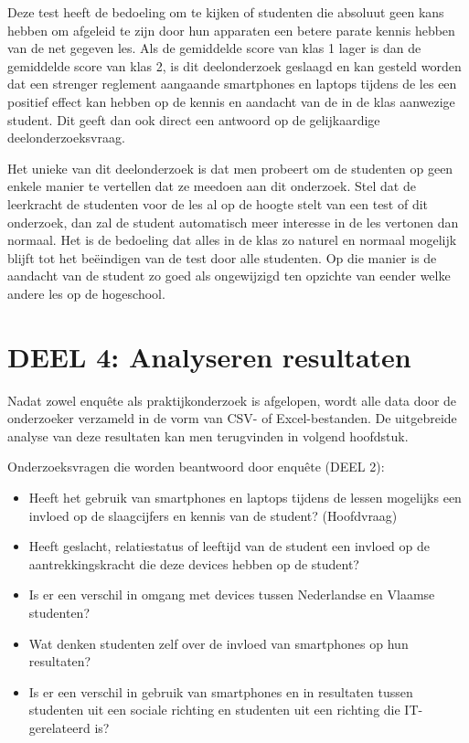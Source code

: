 Deze test heeft de bedoeling om te kijken of studenten die absoluut geen kans hebben om afgeleid te zijn door hun apparaten een betere parate kennis hebben van de net gegeven les. Als de gemiddelde score van klas 1 lager is dan de gemiddelde score van klas 2, is dit deelonderzoek geslaagd en kan gesteld worden dat een strenger reglement aangaande smartphones en laptops tijdens de les een positief effect kan hebben op de kennis en aandacht van de in de klas aanwezige student. Dit geeft dan ook direct een antwoord op de gelijkaardige deelonderzoeksvraag.

Het unieke van dit deelonderzoek is dat men probeert om de studenten op geen enkele manier te vertellen dat ze meedoen aan dit onderzoek. Stel dat de leerkracht de studenten voor de les al op de hoogte stelt van een test of dit onderzoek, dan zal de student automatisch meer interesse in de les vertonen dan normaal. Het is de bedoeling dat alles in de klas zo naturel en normaal mogelijk blijft tot het beëindigen van de test door alle studenten. Op die manier is de aandacht van de student zo goed als ongewijzigd ten opzichte van eender welke andere les op de hogeschool. 

\section{DEEL 4: Analyseren resultaten}
\label{sec:analyse}

Nadat zowel enquête als praktijkonderzoek is afgelopen, wordt alle data door de onderzoeker verzameld in de vorm van CSV- of Excel-bestanden. De uitgebreide analyse van deze resultaten kan men terugvinden in volgend hoofdstuk.

Onderzoeksvragen die worden beantwoord door enquête (DEEL 2):
\begin{itemize}
	\item Heeft het gebruik van smartphones en laptops tijdens de lessen mogelijks een invloed op de slaagcijfers en kennis van de student? (Hoofdvraag)
	\item Heeft geslacht, relatiestatus of leeftijd van de student een invloed op de aantrekkingskracht die deze devices hebben op de student?
	\item Is er een verschil in omgang met devices tussen Nederlandse en Vlaamse studenten?
	\item Wat denken studenten zelf over de invloed van smartphones op hun resultaten?
	\item Is er een verschil in gebruik van smartphones en in resultaten tussen studenten uit een sociale richting en studenten uit een richting die IT-gerelateerd is?
\end{itemize}

